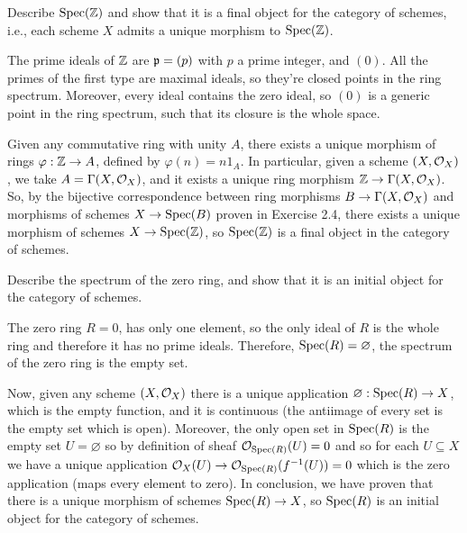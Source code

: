 \begin{ex}
	Describe $\mathrm{Spec}(\mathbb{Z})$ and show that it is a final object for the category of schemes, i.e., each scheme $X$ admits a unique morphism to $\mathrm{Spec}(\mathbb{Z})$.
\end{ex}

\begin{sol}
	The prime ideals of $\mathbb{Z}$ are $\mathfrak{p} = (p)$ with $p$ a prime integer, and $(0)$. All the primes of the first type are maximal ideals, so they're closed points in the ring spectrum. Moreover, every ideal contains the zero ideal, so $(0)$ is a generic point in the ring spectrum, such that its closure is the whole space.

	Given any commutative ring with unity $A$, there exists a unique morphism of rings $\varphi: \mathbb{Z} \to A$, defined by $\varphi(n) = n 1_{A}$. In particular, given a scheme $(X, \mathcal{O}_X)$, we take $A = \Gamma(X,\mathcal{O}_X)$, and it exists a unique ring morphism $\mathbb{Z} \to \Gamma(X, \mathcal{O}_X)$. So, by the bijective correspondence between ring morphisms $B \to \Gamma(X, \mathcal{O}_X)$ and morphisms of schemes $X \to \mathrm{Spec}(B)$ proven in Exercise 2.4, there exists a unique morphism of schemes $X \to \mathrm{Spec}(\mathbb{Z})$, so $\mathrm{Spec}(\mathbb{Z})$ is a final object in the category of schemes.
\end{sol}

\begin{ex}
	Describe the spectrum of the zero ring, and show that it is an initial object for the category of schemes. 
\end{ex}

\begin{sol}
	The zero ring $R = 0$, has only one element, so the only ideal of $R$ is the whole ring and therefore it has no prime ideals. Therefore, $\mathrm{Spec}(R) = \varnothing$, the spectrum of the zero ring is the empty set. 

	Now, given any scheme $(X,\mathcal{O}_X)$ there is a unique application $\varnothing: \mathrm{Spec}(R) \to X$, which is the empty function, and it is continuous (the antiimage of every set is the empty set which is open). Moreover, the only open set in $\mathrm{Spec}(R)$ is the empty set $U = \varnothing$ so by definition of sheaf $\mathcal{O}_{\mathrm{Spec}(R)}(U) = 0$ and so for each $U \subseteq X$ we have a unique application $\mathcal{O}_X(U) \to \mathcal{O}_{\mathrm{Spec}(R)}(f^{-1}(U)) = 0$ which is the zero application (maps every element to zero). In conclusion, we have proven that there is a unique morphism of schemes $\mathrm{Spec}(R) \to X$, so $\mathrm{Spec}(R)$ is an initial object for the category of schemes.
\end{sol}

